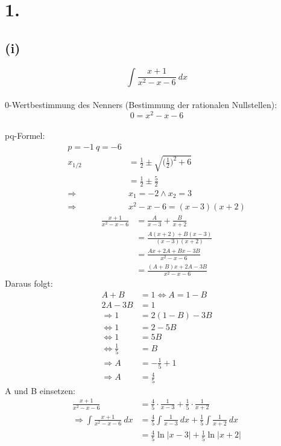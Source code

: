 \documentclass[a4paper]{scrartcl}
\title{\titleinfo}
\author{Elena Noll, Sven-Hendrik Haase, Arne Struck}
\date{\today}
\begin{document}
\maketitle
\notag
\section{1.}
\subsection{(i)}

\[\int \frac{x+1}{x^2 -x-6}\ dx\]\\
0-Wertbestimmung des Nenners (Bestimmung der rationalen Nullstellen):
\[0=x^2 -x-6\]\\
pq-Formel:
\begin{align}
p=-1\ q=-6\\
x_{1/2}&=\frac{1}{2}\pm \sqrt{\Big(\frac{1}{2}\Big)^2 +6}\\
  &=\frac{1}{2}\pm \frac{5}{2}\\
	\Rightarrow & x_1 =-2 \land x_2 =3\\
	\Rightarrow & x^2-x-6=(x-3)(x+2)
\end{align}
\begin{align}
\frac{x+1}{x^2 -x-6}&= \frac{A}{x-3}+\frac{B}{x+2}\\
	&=\frac{A(x+2)+B(x-3)}{(x-3)(x+2)}\\
	&=\frac{Ax+2A+Bx-3B}{x^2 -x-6}\\
	&=\frac{(A+B)x+2A-3B}{x^2 -x-6}
\end{align}
Daraus folgt:
\begin{align}
A+B &= 1 \Leftrightarrow A=1-B\\
2A-3B &= 1\\
\Rightarrow 1&=2(1-B)-3B\\
	\Leftrightarrow 1&=2-5B\\
	\Leftrightarrow 1&=5B\\
	\Leftrightarrow \frac{1}{5} &= B\\
	\Rightarrow A&=-\frac{1}{5}+1\\
	\Rightarrow A&=\frac{4}{5}
\end{align}
A und B einsetzen:
\begin{align}
\frac{x+1}{x^2 -x-6}&=\frac{4}{5}\cdot \frac{1}{x-3}+\frac{1}{5}\cdot\frac{1}{x+2}\\
\Rightarrow	\int \frac{x+1}{x^2 -x-6}\ dx &=\frac{4}{5}\int\frac{1}{x-3}\ dx+\frac{1}{5}\int\frac{1}{x+2}\ dx\\
	&=\frac{4}{5}\ln |x-3|+\frac{1}{5}\ln |x+2|
\end{align}
\end{document}
